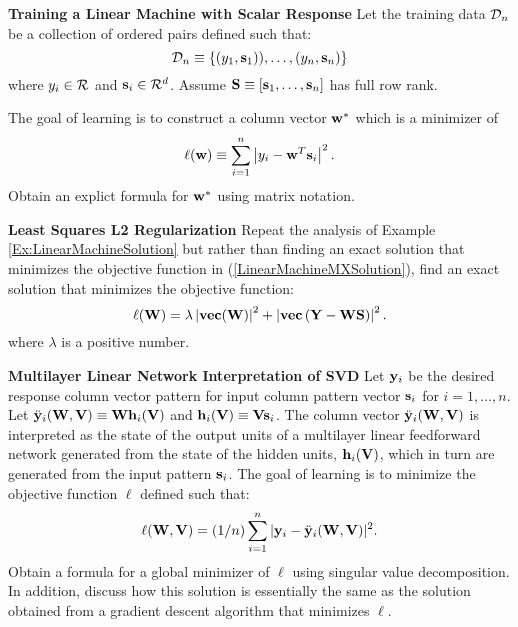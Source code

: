 \begin{exerciselist}
\item
\label{E4.3-1}
{\bf Training a Linear Machine with Scalar Response}
Let the training data ${\cal D}_n$ be a collection of ordered pairs
defined such that:
\begin{displaymath}
{\cal D}_n \equiv \{ (y_1, {\bf s}_1)), \ldots, (y_n, {\bf s}_n) \}
\end{displaymath}
where $y_i \in {\cal R}$ and ${\bf s}_i \in {\cal R}^d$.
Assume ${\bf S} \equiv [{\bf s}_1, \ldots, {\bf s}_n]$ has full row rank.

The goal of learning is to construct a column vector
${\bf w}^*$ which is a minimizer of 
\begin{displaymath}
\ell({\bf w}) \equiv \sum_{i=1}^n \left|y_i - {\bf w}^T {\bf s}_i \right|^2.
\end{displaymath}
Obtain an explict formula for ${\bf w}^*$ using matrix notation.


\item 
\item {\bf Least Squares L2 Regularization}
Repeat the analysis of Example \ref{Ex:LinearMachineSolution} but rather than finding an
exact solution that 
minimizes the objective function in (\ref{LinearMachineMXSolution}), find
an exact solution that minimizes the objective
function:
\begin{equation}
\label{linearlearn1}
\ell({\bf W}) = \lambda \left|{\bf vec}({\bf W}) \right|^2 + 
\left| {\bf vec}\left({\bf Y} - {\bf W} {\bf S}\right) \right|^2.
\end{equation}
where $\lambda$ is a positive number.

\item 
\label{E4.3-3}
{\bf Multilayer Linear Network Interpretation of SVD}
Let ${\bf y}_i$ be the desired response column vector pattern for input column pattern vector
${\bf s}_i$ for $i = 1, \ldots, n$. 
Let $\ddot{\bf y}_i({\bf W}, {\bf V}) \equiv {\bf W} {\bf h}_i({\bf V})$ and
${\bf h}_i({\bf V}) \equiv {\bf V} {\bf s}_i$.
The column vector $\ddot{\bf y}_i({\bf W}, {\bf V})$ is interpreted as the 
state of the output units of a multilayer linear feedforward network generated from the
state of the hidden units, ${\bf h}_i({\bf V})$, which in turn are 
generated from the input pattern ${\bf s}_i$.
The goal of learning is to minimize the objective function
$\ell$ defined such that:
\begin{displaymath}
\ell({\bf W}, {\bf V}) = (1/n) \sum_{i=1}^n |{\bf y}_i - \ddot{\bf y}_i({\bf W}, {\bf V})|^2.
\end{displaymath}
Obtain a formula for a global minimizer of $\ell$ using
singular value decomposition. In addition, discuss how this solution
is essentially the same as the solution obtained from a gradient descent algorithm that minimizes $\ell$.


\end{exerciselist}

